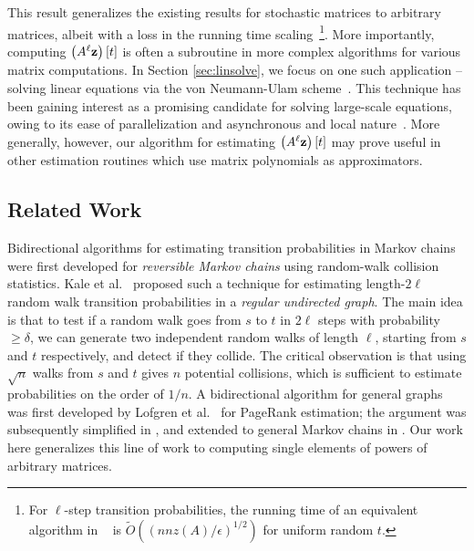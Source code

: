 This result generalizes the existing results for stochastic matrices to arbitrary matrices, albeit with a loss in the running time scaling~\footnote{For $\ell$-step transition probabilities, the running time of an equivalent algorithm in ~\cite{banerjee2015fast} is $\widetilde{O}\left(\left(nnz(A)/\epsilon\right)^{1/2}\right)$ for uniform random $t$.}. 
More importantly, computing $\left(A^{\ell}\mathbf{z}\right)[t]$ is often a subroutine in more complex algorithms for various matrix computations.
In Section \ref{sec:linsolve}, we focus on one such application -- solving linear equations via the von Neumann-Ulam scheme~\cite{forsythe1950matrix}. 
This technique has been gaining interest as a promising candidate for solving large-scale equations, owing to its ease of parallelization and asynchronous and local nature~\cite{ji2013convergence,dimov2015new,lee2014asynchronous}. 
More generally, however, our algorithm for estimating $\left(A^{\ell}\mathbf{z}\right)[t]$ may prove useful in other estimation routines which use matrix polynomials as approximators. 


\subsection{Related Work}

Bidirectional algorithms for estimating transition probabilities in Markov chains were first developed for \emph{reversible Markov chains} using random-walk collision statistics. 
Kale et al.~\cite{Kale2008} proposed such a technique for estimating length-$2\ell$ random walk transition probabilities in a \emph{regular undirected graph}.
The main idea is that to test if a random walk goes from $s$ to $t$ in $2\ell$ steps with probability $\geq\delta$, we can generate two independent random walks of length $\ell$, starting from $s$ and $t$ respectively, and detect if they collide.
The critical observation is that using $\sqrt{n}$ walks from $s$ and $t$ gives $n$ potential collisions, which is sufficient to estimate probabilities on the order of $1/n$.
A bidirectional algorithm for general graphs was first developed by Lofgren et al.~\cite{Lofgren2014} for PageRank estimation; the argument was subsequently simplified in \cite{lofgren2016personalized}, and extended to general Markov chains in \cite{banerjee2015fast}. 
Our work here generalizes this line of work to computing single elements of powers of arbitrary matrices.

